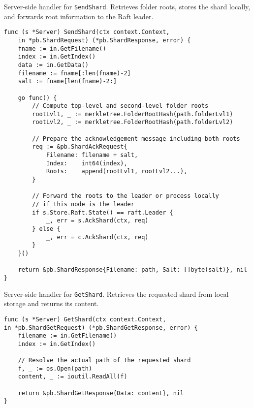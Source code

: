 \begin{listing}[H]
\caption{Server-side handler for \texttt{SendShard}. Retrieves folder roots, stores the shard locally, and forwards root information to the Raft leader.}
\label{code:send-shard-server}
\begin{verbatim}
func (s *Server) SendShard(ctx context.Context,
    in *pb.ShardRequest) (*pb.ShardResponse, error) {
    fname := in.GetFilename()
    index := in.GetIndex()
    data := in.GetData()
    filename := fname[:len(fname)-2]
    salt := fname[len(fname)-2:]

    go func() {
        // Compute top-level and second-level folder roots
        rootLvl1, _ := merkletree.FolderRootHash(path.folderLvl1)
        rootLvl2, _ := merkletree.FolderRootHash(path.folderLvl2)

        // Prepare the acknowledgement message including both roots
        req := &pb.ShardAckRequest{
            Filename: filename + salt,
            Index:    int64(index),
            Roots:    append(rootLvl1, rootLvl2...),
        }

        // Forward the roots to the leader or process locally 
        // if this node is the leader
        if s.Store.Raft.State() == raft.Leader {
            _, err = s.AckShard(ctx, req)
        } else {
            _, err = c.AckShard(ctx, req)
        }
    }()

    return &pb.ShardResponse{Filename: path, Salt: []byte(salt)}, nil
}
\end{verbatim}
\end{listing}

\begin{listing}
\caption{Server-side handler for \texttt{GetShard}. Retrieves the requested shard from local storage and returns its content.}
\label{code:get-shard-server}
\begin{verbatim}
func (s *Server) GetShard(ctx context.Context,
in *pb.ShardGetRequest) (*pb.ShardGetResponse, error) {
    filename := in.GetFilename()
    index := in.GetIndex()

    // Resolve the actual path of the requested shard
    f, _ := os.Open(path)
    content, _ := ioutil.ReadAll(f)

    return &pb.ShardGetResponse{Data: content}, nil
}
\end{verbatim}
\end{listing}